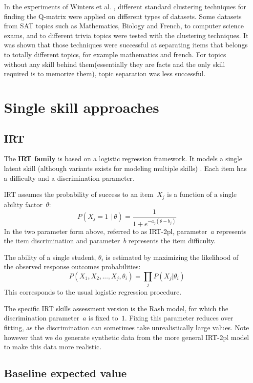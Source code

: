 In the experiments of Winters et al. \citep{Winters05}, different standard clustering techniques for finding the Q-matrix were applied on different types of datasets. Some datasets from SAT topics such as Mathematics, Biology and French, to computer science exams, and to different trivia topics were tested with the clustering techniques. It was shown that those techniques were successful at separating items that belongs to totally different topics, for example mathematics and french. For topics without any skill behind them(essentially they are facts and the only skill required is to memorize them), topic separation was less successful.


\section{Single skill approaches\DIFdelbegin %
\DIFdelend }


\subsection{IRT}

The \textbf{IRT family} is based on a logistic regression framework. It models a single latent skill (although variants exists for modeling multiple skills) \cite{bakerKim2004}.  Each item has a difficulty and a discrimination parameter.

IRT assumes the probability of success to an item~$X_j$ is a function of a single ability factor~$\theta$: 
\[P(X_j\!=\!1\;|\;\theta) = \frac{1}{1+e^{-a_j(\theta-b_j)}}\]
In the two parameter form above, referred to as IRT-2pl, parameter~$a$ represents the item discrimination and parameter~$b$ represents the item difficulty.  

The ability of a single student, $\theta_i$ is estimated by maximizing the likelihood of the observed response outcomes probabilities:
\[ P(X_1, X_2, ..., X_j, \theta_i) = \prod_j P(X_j|\theta_i) \]
This corresponds to the usual logistic regression procedure.

The specific IRT skills assessment version is the Rash model, for which the discrimination parameter~$a$ is fixed to~$1$.  Fixing this parameter reduces over fitting, as the discrimination can sometimes take unrealistically large values. Note however that we do generate synthetic data from the more general IRT-2pl model to make this data more realistic.


\subsection{Baseline expected value}


